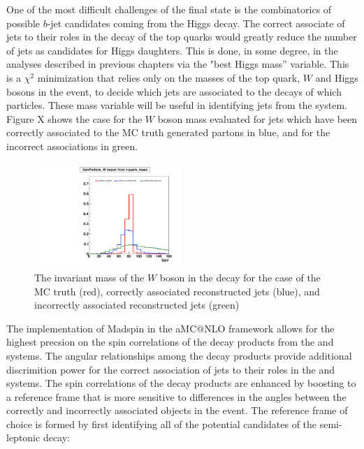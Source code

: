 \par One of the most difficult challenges of the \ttH final state is
the combinatorics of possible $b$-jet candidates coming from the Higgs
decay.  The correct associate of jets to their roles in the decay of
the top quarks would greatly reduce the number of jets as candidates
for Higgs daughters.  This is done, in some degree, in the analyses
described in previous chapters via the "best Higgs mass'' variable.
This is a $\chi^{2}$ minimization that relies only on the masses of
the top quark, $W$ and Higgs bosons in the event, to decide which jets
are associated to the decays of which particles.  These mass variable
will be useful in identifying jets from the \ttbar system.  Figure X shows the
case for the $W$ boson mass evaluated for jets which have been
correctly associated to the MC truth generated partons in blue, and
for the incorrect associations in green.  

\begin{figure}[hbtp] 
  {\centering
    \includegraphics[width=0.50\textwidth]{Figures/Analysis_Improvement_Diagrams/tt012jets__h_genParticle_w_boson_fromTop_mass__vs__h_recoJets_correctAssoc_labFrame_mHadW__vs__h_recoJets_wrongAssoc_labFrame_mHadW__unitNorm.pdf}
    \caption{The invariant mass of the $W$ boson in the \ttbar decay
      for the case of the MC truth (red), correctly associated reconstructed
      jets (blue), and incorrectly associated reconstructed jets (green)}
    \label{fig:aMCatNLO_wMass}}
\end{figure}

\par The implementation of Madspin in the aMC@NLO framework allows for
the highest precsion on the spin correlations of the decay
products from the \ttH and \ttbar systems.  The angular relationships
among the decay products provide additional discrimition power for the
correct association of jets to their roles in the \ttH and \ttbar
systems.  The spin correlations of the decay products are enhanced by
boosting to a reference frame that is more sensitive to differences in
the angles between the correctly and incorrectly associated objects in
the event.  The reference frame of choice is formed by first
identifying all of the potential candidates of the semi-leptonic
\ttbar decay:

